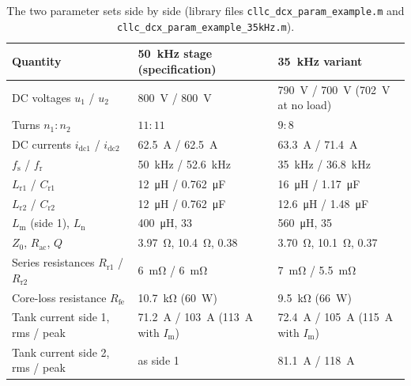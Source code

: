 \documentclass[12pt,a4paper]{scrartcl}
\newcommand{\ped}[1]{_{\mathrm{#1}}}
\newcommand{\code}[1]{\texttt{#1}}
\begin{document}
\begin{onehalfspace}
\begin{table}[H]
	\centering
	\captionsetup{width=0.9\textwidth, font=small}
	\caption[The two parameter sets side by side.]{The two parameter sets side by side (library files \code{cllc\_dcx\_param\_example.m} and \code{cllc\_dcx\_param\_example\_35kHz.m}).}
	\label{tab:compare}
	\small
	\begin{tabularx}{0.97\textwidth}{@{} >{\raggedright\arraybackslash}p{} X X @{}}
		\toprule
		\textbf{Quantity} & \textbf{\SI{50}{\kilo\hertz} stage (specification)} & \textbf{\SI{35}{\kilo\hertz} variant} \\
		\midrule
		DC voltages $u\ped{1}$ / $u\ped{2}$ & \SI{800}{\volt} / \SI{800}{\volt} & \SI{790}{\volt} / \SI{700}{\volt} (\SI{702}{\volt} at no load) \\
		Turns $n\ped{1} : n\ped{2}$ & $11 : 11$ & $9 : 8$ \\
		DC currents $i\ped{dc1}$ / $i\ped{dc2}$ & \SI{62.5}{\ampere} / \SI{62.5}{\ampere} & \SI{63.3}{\ampere} / \SI{71.4}{\ampere} \\
		$f\ped{s}$ / $f\ped{r}$ & \SI{50}{\kilo\hertz} / \SI{52.6}{\kilo\hertz} & \SI{35}{\kilo\hertz} / \SI{36.8}{\kilo\hertz} \\
		$L\ped{r1}$ / $C\ped{r1}$ & \SI{12}{\micro\henry} / \SI{0.762}{\micro\farad} & \SI{16}{\micro\henry} / \SI{1.17}{\micro\farad} \\
		$L\ped{r2}$ / $C\ped{r2}$ & \SI{12}{\micro\henry} / \SI{0.762}{\micro\farad} & \SI{12.6}{\micro\henry} / \SI{1.48}{\micro\farad} \\
		$L\ped{m}$ (side 1), $L\ped{n}$ & \SI{400}{\micro\henry}, 33 & \SI{560}{\micro\henry}, 35 \\
		$Z\ped{0}$, $R\ped{ac}$, $Q$ & \SI{3.97}{\ohm}, \SI{10.4}{\ohm}, 0.38 & \SI{3.70}{\ohm}, \SI{10.1}{\ohm}, 0.37 \\
		Series resistances $R\ped{r1}$ / $R\ped{r2}$ & \SI{6}{\milli\ohm} / \SI{6}{\milli\ohm} & \SI{7}{\milli\ohm} / \SI{5.5}{\milli\ohm} \\
		Core-loss resistance $R\ped{fe}$ & \SI{10.7}{\kilo\ohm} (\SI{60}{\watt}) & \SI{9.5}{\kilo\ohm} (\SI{66}{\watt}) \\
		Tank current side 1, rms / peak & \SI{71.2}{\ampere} / \SI{103}{\ampere} (\SI{113}{\ampere} with $I\ped{m}$) & \SI{72.4}{\ampere} / \SI{105}{\ampere} (\SI{115}{\ampere} with $I\ped{m}$) \\
		Tank current side 2, rms / peak & as side 1 & \SI{81.1}{\ampere} / \SI{118}{\ampere} \\

\end{tabularx}
\end{table}
\end{onehalfspace}
\end{document}
